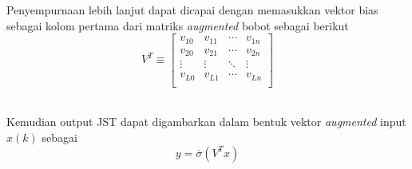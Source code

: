 Penyempurnaan lebih lanjut dapat dicapai dengan memasukkan vektor bias sebagai kolom pertama dari matriks \textit{augmented} bobot sebagai berikut
\vspace{-1em}
\begin{equation} \label{eq:3:fullVector}
V^T \equiv
\left[
\begin{matrix}
v_{10} & v_{11} & \cdots & v_{1n} \\
v_{20} & v_{21} & \cdots & v_{2n} \\
\vdots & \vdots & \ddots & \vdots \\
v_{L0} & v_{L1} & \cdots & v_{Ln} \\
\end{matrix}
\right]
\end{equation}\

Kemudian output JST dapat digambarkan dalam bentuk vektor \textit{augmented} input $x(k)$ sebagai
\vspace{0em}
\begin{equation} \label{eq:3:finalVector}
y = \overline{\sigma}(V^Tx)
\end{equation}

